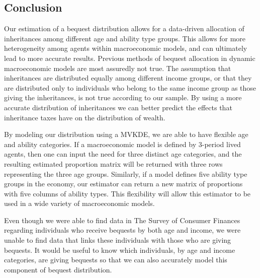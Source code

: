 \documentclass[letterpaper,12pt]{article}
\theoremstyle{definition}
\begin{document}
\begin{spacing}{1.5}
\section{Conclusion}\label{SecConclusion}

Our estimation of a bequest distribution allows for a data-driven allocation of inheritances among different age and ability type groups. This allows for more heterogeneity among agents within macroeconomic models, and can ultimately lead to more accurate results. Previous methods of bequest allocation in dynamic macroeconomic models are most assuredly not true. The assumption that inheritances are distributed equally among different income groups, or that they are distributed only to individuals who belong to the same income group as those giving the inheritances, is not true according to our sample. By using a more accurate distribution of inheritances we can better predict the effects that inheritance taxes have on the distribution of wealth.

By modeling our distribution using a MVKDE, we are able to have flexible age and ability categories. If a macroeconomic model is defined by 3-period lived agents, then one can input the need for three distinct age categories, and the resulting estimated proportion matrix will be returned with three rows representing the three age groups. Similarly, if a model defines five ability type groups in the economy, our estimator can return a new matrix of proportions with five columns of ability types. This flexibility will allow this estimator to be used in a wide variety of macroeconomic models.

Even though we were able to find data in The Survey of Consumer Finances regarding individuals who receive bequests by both age and income, we were unable to find data that links these individuals with those who are giving bequests. It would be useful to know which individuals, by age and income categories, are giving bequests so that we can also accurately model this component of bequest distribution.



\clearpage


\end{spacing}


\newpage



\end{document}
